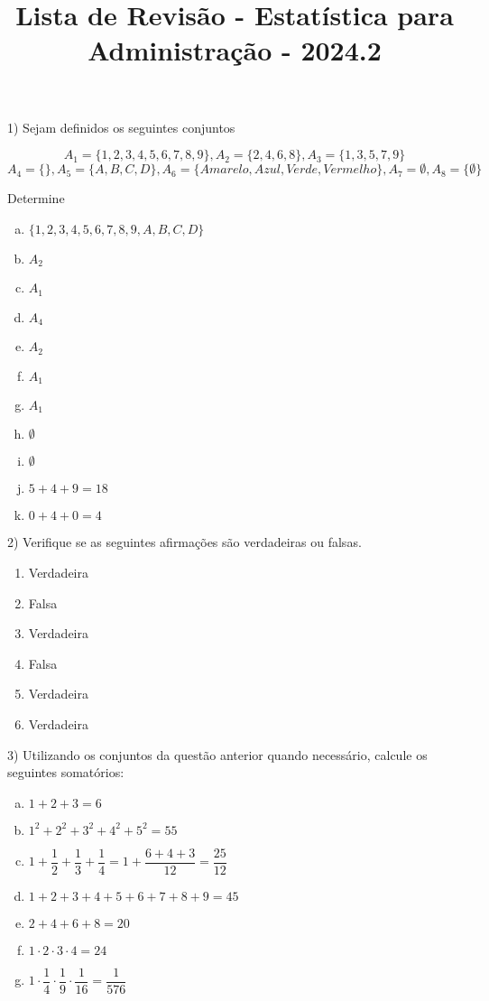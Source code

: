 \documentclass{article}
\title{Lista de Revisão - Estatística para Administração - 2024.2}
\begin{document}
\date{}
\maketitle

1) Sejam definidos os seguintes conjuntos

$$A_1 = \{1,2,3,4,5,6,7,8,9\}, A_2 = \{2, 4, 6, 8\}, A_3 = \{1, 3, 5, 7, 9\}$$
$$A_4 = \{\}, A_5 = \{A, B, C, D\}, A_6 = \{Amarelo, Azul, Verde, Vermelho\}, A_7 = \emptyset, A_8 = \{\emptyset\}$$

Determine

\begin{enumerate}[a)] %
    \item  $\{1,2,3,4,5,6,7,8,9,A, B, C, D\}$
    \item $A_2$
    \item $A_1$
    \item $A_4$
    \item $A_2$
    \item $A_1$
    \item $A_1$
    \item $\emptyset$
    \item $\emptyset$
    \item $5 + 4 + 9 = 18$
    \item $0 + 4 + 0 = 4$
\end{enumerate}
\vspace{10px}

2) Verifique se as seguintes afirmações são verdadeiras ou falsas. 

\begin{enumerate}
    \item Verdadeira
    \item Falsa
    \item Verdadeira
    \item Falsa
    \item Verdadeira
    \item Verdadeira
\end{enumerate}

3) Utilizando os conjuntos da questão anterior quando necessário, calcule os seguintes somatórios:

\begin{enumerate}[a)] %
    \item $1+2+3 = 6$ \\
    \item $1^2 + 2^2 + 3^2 + 4^2 +5^2 = 55$ \\
    \item $1+ \dfrac{1}{2} + \dfrac{1}{3} + \dfrac{1}{4} = 1 + \dfrac{6 + 4 + 3}{12} = \dfrac{25}{12}$ \\
    \item $1 + 2 + 3 + 4 + 5 +6 + 7 + 8 + 9 = 45$ \\
    \item $2+4+6+8 = 20$ \\
    \item $1 \cdot 2 \cdot 3 \cdot 4 = 24$
    \item $1 \cdot \dfrac{1}{4} \cdot \dfrac{1}{9} \cdot \dfrac{1}{16} = \dfrac{1}{576}$
\end{enumerate}
\vspace{10px}
\end{document}
